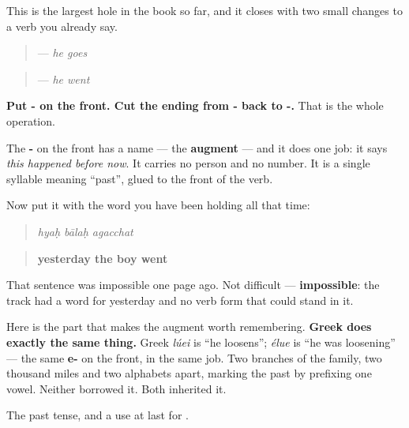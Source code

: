 \begin{grammarlens}[title={Grammar Lens: two changes, and the present becomes the past}]
This is the largest hole in the book so far, and it closes with two small changes to a verb you already say.

\begin{quote}
\textbf{} — \emph{he goes}
\end{quote}

\begin{quote}
\textbf{} — \emph{he went}
\end{quote}

\textbf{Put - on the front. Cut the ending from - back to -.} That is the whole operation.

The \textbf{-} on the front has a name — the \textbf{augment} — and it does one job: it says \emph{this happened before now}. It carries no person and no number. It is a single syllable meaning \textquotedblleft{}past\textquotedblright{}, glued to the front of the verb.

Now put it with the word you have been holding all that time:

\begin{quote}
\textbf{  }
\end{quote}

\begin{quote}
\emph{hyaḥ bālaḥ agacchat}
\end{quote}

\begin{quote}
\textbf{yesterday the boy went}
\end{quote}

That sentence was impossible one page ago. Not difficult — \textbf{impossible}: the track had a word for yesterday and no verb form that could stand in it.

Here is the part that makes the augment worth remembering. \textbf{Greek does exactly the same thing.} Greek \emph{lúei} is \textquotedblleft{}he loosens\textquotedblright{}; \emph{élue} is \textquotedblleft{}he was loosening\textquotedblright{} — the same \textbf{e-} on the front, in the same job. Two branches of the family, two thousand miles and two alphabets apart, marking the past by prefixing one vowel. Neither borrowed it. Both inherited it.
\end{grammarlens}

\begin{grammarlens}[title={What you've built}]
The past tense, and a use at last for \textbf{}.
\end{grammarlens}

